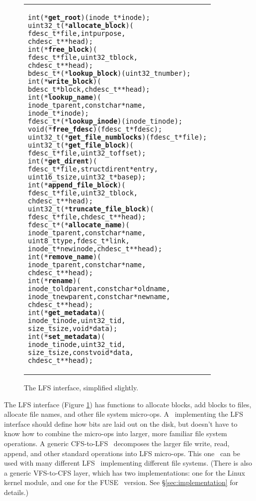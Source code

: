 \begin{figure}[htb]
\vskip-14pt
\begin{tabular}{@{\hskip0.25in}p{2in}@{}}
\begin{scriptsize}
\begin{alltt}
int (*{\bf get_root})(inode_t *inode);
uint32_t (*{\bf allocate_block})(
    fdesc_t *file, int purpose,
    chdesc_t **head);
int (*{\bf free_block})(
    fdesc_t *file, uint32_t block,
    chdesc_t **head);
bdesc_t *(*{\bf lookup_block})(uint32_t number);
int (*{\bf write_block})(
    bdesc_t *block, chdesc_t **head);
int (*{\bf lookup_name})(
    inode_t parent, const char *name,
    inode_t *inode);
fdesc_t *(*{\bf lookup_inode})(inode_t inode);
void (*{\bf free_fdesc})(fdesc_t *fdesc);
uint32_t (*{\bf get_file_numblocks})(fdesc_t *file);
uint32_t (*{\bf get_file_block})(
    fdesc_t *file, uint32_t offset);
int (*{\bf get_dirent})(
    fdesc_t *file, struct dirent *entry,
    uint16_t size, uint32_t *basep);
int (*{\bf append_file_block})(
    fdesc_t *file, uint32_t block,
    chdesc_t **head);
uint32_t (*{\bf truncate_file_block})(
    fdesc_t *file, chdesc_t **head);
fdesc_t *(*{\bf allocate_name})(
    inode_t parent, const char *name,
    uint8_t type, fdesc_t *link,
    inode_t *newinode, chdesc_t **head);
int (*{\bf remove_name})(
    inode_t parent, const char *name,
    chdesc_t **head);
int (*{\bf rename})(
    inode_t oldparent, const char *oldname,
    inode_t newparent, const char *newname,
    chdesc_t **head);
int (*{\bf get_metadata})(
    inode_t inode, uint32_t id,
    size_t size, void *data);
int (*{\bf set_metadata})(
    inode_t inode, uint32_t id,
    size_t size, const void *data,
    chdesc_t **head);
\end{alltt}
\end{scriptsize}
\end{tabular}
\vspace{-10pt}
\caption{\label{fig:lfs} The LFS interface, simplified slightly.}
\end{figure}

The LFS interface (Figure \ref{fig:lfs}) has functions to allocate blocks, add
blocks to files, allocate file names, and other file system micro-ops. A
\module\ implementing the LFS interface should define how bits are laid out on
the disk, but doesn't have to know how to combine the micro-ops into larger,
more familiar file system operations. A generic CFS-to-LFS \module\ decomposes
the larger file write, read, append, and other standard operations into LFS
micro-ops. This one \module\ can be used with many different LFS \modules\
implementing different file systems. (There is also a generic VFS-to-CFS layer,
which has two implementations: one for the Linux kernel module, and one for the
FUSE~\cite{fuse} version. See \S\ref{sec:implementation} for details.)

